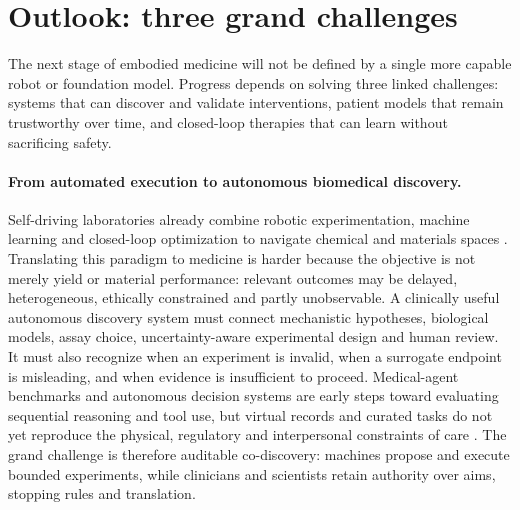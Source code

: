 \section{Outlook: three grand challenges}

The next stage of embodied medicine will not be defined by a single more capable robot or foundation model. Progress depends on solving three linked challenges: systems that can discover and validate interventions, patient models that remain trustworthy over time, and closed-loop therapies that can learn without sacrificing safety.

\paragraph{From automated execution to autonomous biomedical discovery.}
Self-driving laboratories already combine robotic experimentation, machine learning and closed-loop optimization to navigate chemical and materials spaces \cite{Hase2019NextGenerationExperimentation,Burger2020MobileRoboticChemist,MacLeod2020SelfDrivingLaboratory,Angello2022ClosedLoopOptimization,Tom2024SelfDrivingLaboratories}. Translating this paradigm to medicine is harder because the objective is not merely yield or material performance: relevant outcomes may be delayed, heterogeneous, ethically constrained and partly unobservable. A clinically useful autonomous discovery system must connect mechanistic hypotheses, biological models, assay choice, uncertainty-aware experimental design and human review. It must also recognize when an experiment is invalid, when a surrogate endpoint is misleading, and when evidence is insufficient to proceed. Medical-agent benchmarks and autonomous decision systems are early steps toward evaluating sequential reasoning and tool use, but virtual records and curated tasks do not yet reproduce the physical, regulatory and interpersonal constraints of care \cite{Jiang2025MedAgentBench,Ferber2025OncologyAgent,Ferber2026AutonomousMedicalAIAgents,Tu2025ConversationalDiagnosticAI}. The grand challenge is therefore auditable co-discovery: machines propose and execute bounded experiments, while clinicians and scientists retain authority over aims, stopping rules and translation.

